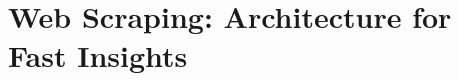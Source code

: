 \documentclass{beamer}
\begin{document}
%
%
%
%

\section{Web Scraping: Architecture for Fast Insights }
\end{document}

